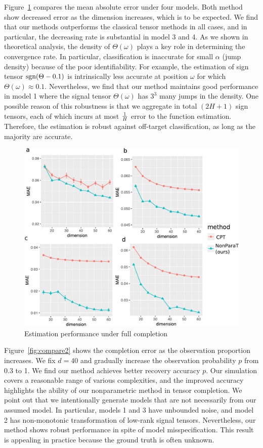 \documentclass{article}
\theoremstyle{plain}
\theoremstyle{definition}
\def\sign{\textup{sgn}}
\begin{document}
Figure~\ref{fig:compare1} compares the mean absolute error under four models. Both method show decreased error as the dimension increases, which is to be expected. We find that our methods outperforms the classical tensor methods in all cases, and in particular, the decreasing rate is substantial in model 3 and 4. 
As we shown in theoretical analysis, the density of $\Theta(\omega)$ plays a key role in determining the convergence rate. In particular, classification is inaccurate for small $\alpha$ (jump density) because of the poor identifiability. For example, the estimation of sign tensor $\sign(\Theta-0.1)$ is intrinsically less accurate at position $\omega$ for which $\Theta(\omega)\approx 0.1$. Nevertheless, we find that our method maintains good performance in model 1 where the signal tensor $\Theta(\omega)$ has $3^3$ many jumps in the density. One possible reason of this robustness is that we aggregate in total $(2H+1)$ sign tensors, each of which incurs at most ${1\over H}$ error to the function estimation.  Therefore, the estimation is robust against off-target classification, as long as the majority are accurate.  

\begin{figure}[h!]
\includegraphics[width=.5\textwidth]{figure/fig1-4.pdf}
\caption{Estimation performance under full completion}\label{fig:compare1}
\end{figure}

Figure~\ref{fig:compare2} shows the completion error as the observation proportion increases. We fix $d=40$ and gradually increase the observation probability $p$ from 0.3 to 1. We find our method achieves better recovery accuracy $p$. Our simulation covers a reasonable range of various complexities, and the improved accuracy highlights the ability of our nonparametric method in tensor completion. We point out that we intentionally generate models that are not necessarily from our assumed model. In particular, models 1 and 3 have unbounded noise, and model 2 has non-monotonic transformation of low-rank signal tensors. Nevertheless, our method shows robust performance in spite of model misspecification. This result is appealing in practice because the ground truth is often unknown. 
\end{document}
